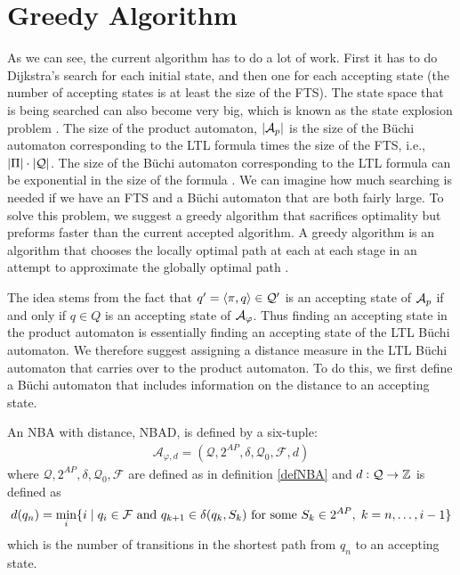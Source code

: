 \section{Greedy Algorithm}
As we can see, the current algorithm has to do a lot of work. First it has to do Dijkstra's search for each initial state, and then one for each accepting state (the number of accepting states is at least the size of the FTS). The state space that is being searched can also become very big, which is known as the state explosion problem \cite{clarke99}. The size of the product automaton, $|\mathcal{A}_p|$ is the size of the B\"{u}chi automaton corresponding to the LTL formula times the size of the FTS, i.e.,\ $|\Pi| \cdot |\mathcal{Q}|$. The size of the B\"{u}chi automaton corresponding to the LTL formula can be exponential in the size of the formula \cite{giannakopoulou02}. We can imagine how much searching is needed if we have an FTS and a B\"{u}chi automaton that are both fairly large. To solve this problem, we suggest a greedy algorithm that sacrifices optimality but preforms faster than the current accepted algorithm. A greedy algorithm is an algorithm that chooses the locally optimal path at each at each stage in an attempt to approximate the globally optimal path \cite{cormen01}.

The idea stems from the fact that $q' = \langle \pi, q \rangle \in \mathcal{Q}'$ is an accepting state of $\mathcal{A}_p$ if and only if $q \in Q$ is an accepting state of $\mathcal{A}_\varphi$. Thus finding an accepting state in the product automaton is essentially finding an accepting state of the LTL B\"{u}chi automaton. We therefore suggest assigning a distance measure in the LTL B\"{u}chi automaton that carries over to the product automaton. To do this, we first define a B\"{u}chi automaton that includes information on the distance to an accepting state.

\begin{definition}
\label{defBWD}
An NBA with distance, NBAD, is defined by a six-tuple:
\begin{align*}
\mathcal{A}_{\varphi,d} = (\mathcal{Q},2^{AP},\delta,\mathcal{Q}_0,\mathcal{F},d)
\end{align*}
where $\mathcal{Q},2^{AP},\delta,\mathcal{Q}_0,\mathcal{F}$ are defined as in definition \ref{defNBA} and $d:\mathcal{Q} \rightarrow \mathbb{Z}$ is defined as 
\begin{align*}
d(q_n) = \min_i \{ i \hspace{0.1cm}|\hspace{0.1cm} q_i \in \mathcal{F} \text{ and } q_{k+1} \in \delta(q_{k},S_{k}) \text{ for some } S_k \in 2^{AP},\hspace{0.1cm} k = n,\dots, i-1 \}
\end{align*}
which is the number of transitions in the shortest path from $q_n$ to an accepting state.
\end{definition}

